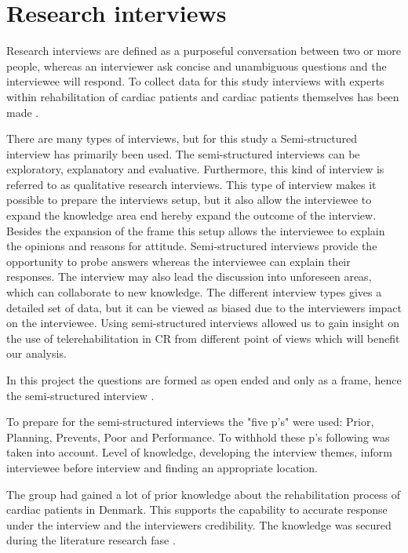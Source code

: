 \section{Research interviews}
\label{qualitative}

Research interviews are defined as a purposeful conversation between two or more people, whereas an interviewer ask concise and unambiguous questions and the interviewee will respond. To collect data for this study interviews with experts within rehabilitation of  cardiac patients and cardiac patients themselves has been made \cite{mark2009research}. 

There are many types of interviews, but for this study a Semi-structured interview has primarily been used. The semi-structured interviews can be exploratory, explanatory and evaluative. Furthermore, this kind of interview is referred to as qualitative research interviews.
This type of interview makes it possible to prepare the interviews setup, but it also allow the interviewee to expand the knowledge area end hereby expand the outcome of the interview. 
Besides the expansion of the frame this setup allows the interviewee to explain the opinions and reasons for attitude. Semi-structured interviews provide the opportunity to probe answers whereas the interviewee can explain their responses. The interview may also lead the discussion into unforeseen areas, which can collaborate to new knowledge. The different interview types gives a detailed set of data, but it can be viewed as biased due to the interviewers impact on the interviewee. Using semi-structured interviews allowed us to gain insight on the use of telerehabilitation in CR from different point of views which will benefit our analysis.

In this project the questions are formed as open ended and only as a frame, hence the semi-structured interview \cite{mark2009research}.

To prepare for the semi-structured interviews the "five p's" were used: Prior, Planning, Prevents, Poor and Performance. To withhold these p's following was taken into account. Level of knowledge, developing the interview themes, inform interviewee before interview and finding an appropriate location. 

The group had gained a lot of prior knowledge about the rehabilitation process of cardiac patients in Denmark. This supports the capability to accurate response under the interview and the interviewers credibility. The knowledge was secured during the literature research fase \cite{mark2009research}. 

